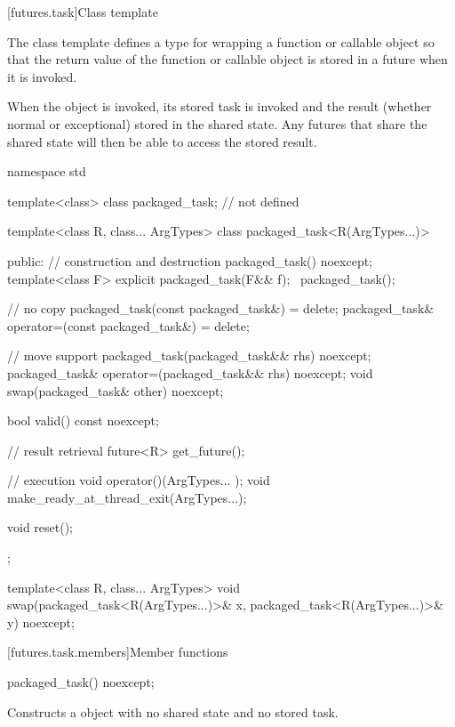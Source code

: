 [futures.task]{Class template }

\pnum
The class template  defines a type for wrapping a function or
callable object so that the return value of the function or callable object is stored in
a future when it is invoked.

\pnum
When the  object is invoked, its stored task is invoked and the
result (whether normal or exceptional) stored in the shared state. Any futures that
share the shared state will then be able to access the stored result.

%
\begin{codeblock}
namespace std {
  template<class> class packaged_task;  // not defined

  template<class R, class... ArgTypes>
  class packaged_task<R(ArgTypes...)> {
  public:
    // construction and destruction
    packaged_task() noexcept;
    template<class F>
      explicit packaged_task(F&& f);
    ~packaged_task();

    // no copy
    packaged_task(const packaged_task&) = delete;
    packaged_task& operator=(const packaged_task&) = delete;

    // move support
    packaged_task(packaged_task&& rhs) noexcept;
    packaged_task& operator=(packaged_task&& rhs) noexcept;
    void swap(packaged_task& other) noexcept;

    bool valid() const noexcept;

    // result retrieval
    future<R> get_future();

    // execution
    void operator()(ArgTypes... );
    void make_ready_at_thread_exit(ArgTypes...);

    void reset();
  };

  template<class R, class... ArgTypes>
    void swap(packaged_task<R(ArgTypes...)>& x, packaged_task<R(ArgTypes...)>& y) noexcept;
}
\end{codeblock}

[futures.task.members]{Member functions}

%
\begin{itemdecl}
packaged_task() noexcept;
\end{itemdecl}

\begin{itemdescr}
\pnum
\effects
Constructs a  object with no shared state and no stored task.
\end{itemdescr}

